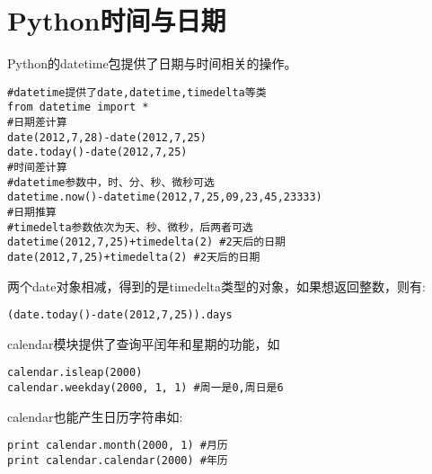 

\section{Python时间与日期} 

Python的datetime包提供了日期与时间相关的操作。
\begin{verbatim}
#datetime提供了date,datetime,timedelta等类
from datetime import * 
#日期差计算
date(2012,7,28)-date(2012,7,25)
date.today()-date(2012,7,25)
#时间差计算
#datetime参数中，时、分、秒、微秒可选
datetime.now()-datetime(2012,7,25,09,23,45,23333)
#日期推算
#timedelta参数依次为天、秒、微秒，后两者可选
datetime(2012,7,25)+timedelta(2) #2天后的日期
date(2012,7,25)+timedelta(2) #2天后的日期
\end{verbatim}

两个date对象相减，得到的是timedelta类型的对象，如果想返回整数，则有:
\begin{verbatim}
(date.today()-date(2012,7,25)).days
\end{verbatim}

calendar模块提供了查询平闰年和星期的功能，如
\begin{verbatim}
calendar.isleap(2000)
calendar.weekday(2000, 1, 1) #周一是0,周日是6
\end{verbatim}
calendar也能产生日历字符串如:
\begin{verbatim}
print calendar.month(2000, 1) #月历
print calendar.calendar(2000) #年历
\end{verbatim}

\label{sec:pythonTimeCalc}


